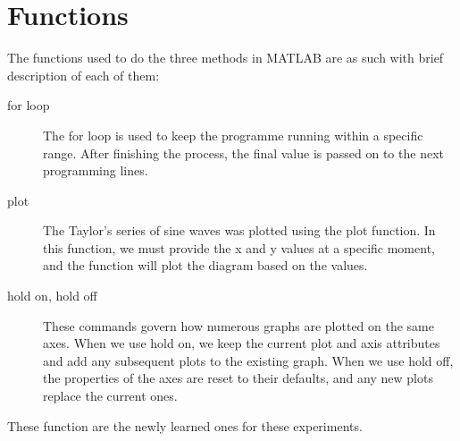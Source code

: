 \documentclass[12pt]{article}
\begin{document}




\pagebreak
\section*{Functions}
The functions used to do the three methods in MATLAB are as such with brief description of each of them:
\begin{description}
    \item[for loop] The for loop is used to keep the programme running within a specific range. After finishing the process, the final value is passed on to the next programming lines.
    \item[plot] The Taylor's series of sine waves was plotted using the plot function. In this function, we must provide the x and y values at a specific moment, and the function will plot the diagram based on the values.
    \item[hold on, hold off] These commands govern how numerous graphs are plotted on the same axes. When we use hold on, we keep the current plot and axis attributes and add any subsequent plots to the existing graph. When we use hold off, the properties of the axes are reset to their defaults, and any new plots replace the current ones.


\end{description}
These function are the newly learned ones for these experiments.\cite{matlab}
\pagebreak


\end{document}
